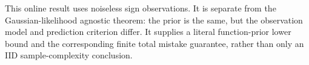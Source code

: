 This online result uses noiseless sign observations. It is separate from the Gaussian-likelihood agnostic theorem: the prior is the same, but the observation model and prediction criterion differ. It supplies a literal function-prior lower bound and the corresponding finite total mistake guarantee, rather than only an IID sample-complexity conclusion.
